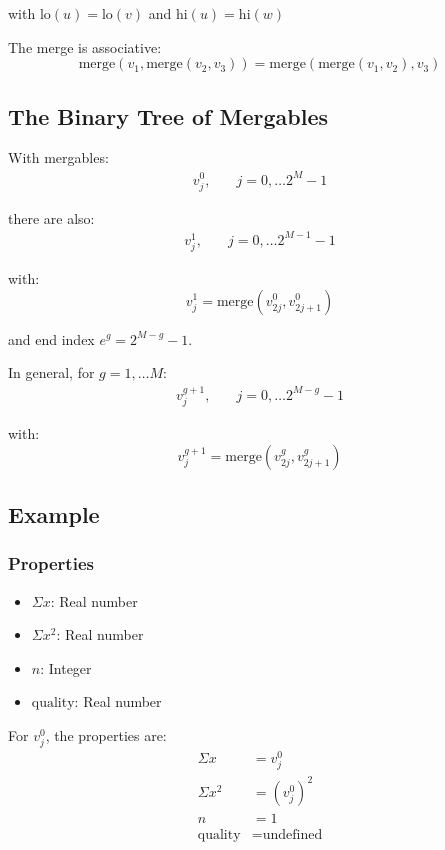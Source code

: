 \documentclass{article}
\theoremstyle{plain}
\begin{document}
with  $\text{lo}(u)=\text{lo}(v)$ and $\text{hi}(u)=\text{hi}(w)$

The merge is associative:
\[
\text{merge} (v_1, \text{merge}(v_2, v_3)) =  \text{merge} (\text{merge}(v_1, v_2), v_3) 
\]

\subsection*{The Binary Tree of Mergables}

With mergables:
\begin{align*}
    v^0_j, & \quad j = 0, \dots 2^M - 1
\end{align*}

there are also:
\begin{align*}
    v^1_j, & \quad j = 0, \dots 2^{M-1} - 1
\end{align*}

with:
\[
v^1_j = \text{merge}(v^0_{2j}, v^0_{2j+1})
\]

and end index $e^g = 2^{M-g} - 1$.

In general, for $g = 1, \dots M$:
\begin{align*}
    v^{g+1}_j, & \quad j = 0, \dots 2^{M-g} - 1
\end{align*}

with:
\[
v^{g+1}_j = \text{merge}(v^g_{2j}, v^g_{2j+1})
\]

\subsection*{Example}

\subsubsection*{Properties}
\begin{itemize}
    \item $\Sigma x$: Real number
    \item $\Sigma x^2$: Real number
    \item $n$: Integer
    \item $\text{quality}$: Real number
\end{itemize}

For $v^0_j$, the properties are:
\begin{align*}
    \Sigma x & = v^0_j \\
    \Sigma x^2 & = (v^0_j)^2 \\
    n & = 1 \\
    \text{quality} & = \text{undefined}
\end{align*}
\end{document}
